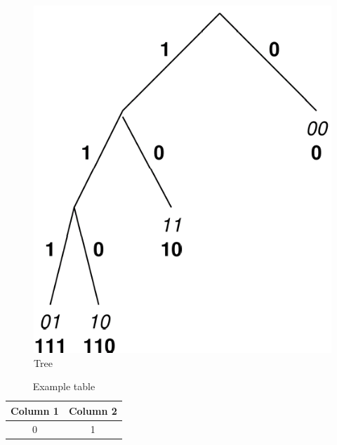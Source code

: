 \documentclass{sigkdd}
\begin{document}
\begin{figure}[h]
	\begin{center}
		\includegraphics[scale=0.2]{figure1.png}
		\caption{Tree}\label{fig:tree}
	\end{center}
\end{figure}

\begin{table}[h]
	\begin{center}
		\caption{Example table}\label{tab:example}
		\begin{tabular}{c|c}
			Column 1 & Column 2\\
			\hline
			0 & 1\\
		\end{tabular}
	\end{center}
\end{table}



\end{document}
